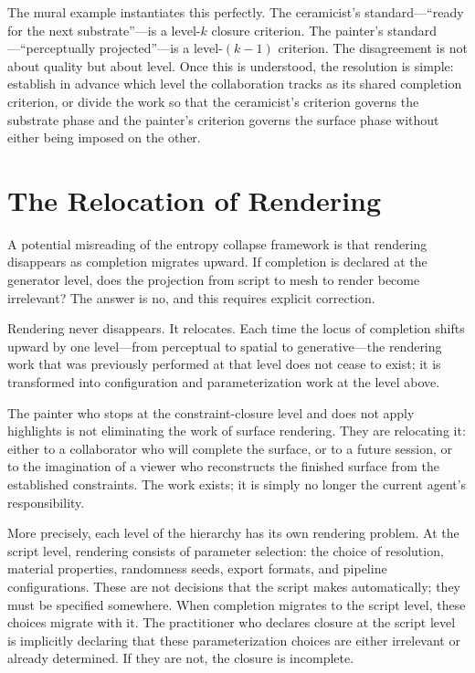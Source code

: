 \documentclass[11pt, twoside]{article}
\theoremstyle{plain}
\theoremstyle{definition}
\theoremstyle{remark}
\begin{document}
The mural example instantiates this perfectly. The ceramicist's standard---``ready for the next substrate''---is a level-$k$ closure criterion. The painter's standard---``perceptually projected''---is a level-$(k-1)$ criterion. The disagreement is not about quality but about level. Once this is understood, the resolution is simple: establish in advance which level the collaboration tracks as its shared completion criterion, or divide the work so that the ceramicist's criterion governs the substrate phase and the painter's criterion governs the surface phase without either being imposed on the other.

\section{The Relocation of Rendering}
\label{sec:relocation}

A potential misreading of the entropy collapse framework is that rendering disappears as completion migrates upward. If completion is declared at the generator level, does the projection from script to mesh to render become irrelevant? The answer is no, and this requires explicit correction.

Rendering never disappears. It relocates. Each time the locus of completion shifts upward by one level---from perceptual to spatial to generative---the rendering work that was previously performed at that level does not cease to exist; it is transformed into configuration and parameterization work at the level above.

The painter who stops at the constraint-closure level and does not apply highlights is not eliminating the work of surface rendering. They are relocating it: either to a collaborator who will complete the surface, or to a future session, or to the imagination of a viewer who reconstructs the finished surface from the established constraints. The work exists; it is simply no longer the current agent's responsibility.

More precisely, each level of the hierarchy has its own rendering problem. At the script level, rendering consists of parameter selection: the choice of resolution, material properties, randomness seeds, export formats, and pipeline configurations. These are not decisions that the script makes automatically; they must be specified somewhere. When completion migrates to the script level, these choices migrate with it. The practitioner who declares closure at the script level is implicitly declaring that these parameterization choices are either irrelevant or already determined. If they are not, the closure is incomplete.
\end{document}
